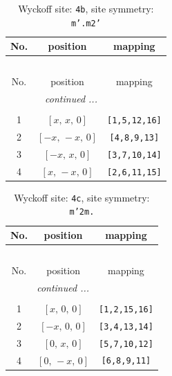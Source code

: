 \documentclass[fleqn,8pt]{jsarticle}
\begin{document}
\begin{longtable}{ccc}
\caption{Wyckoff site: {\tt 4b}, site symmetry: {\tt m'.m2'}}
 \\
 \hline \hline
No. & position & mapping \\ \hline \endfirsthead

\multicolumn{2}{l}{\tablename\ \thetable{}} \\
 \hline \hline
No. & position & mapping \\ \hline \endhead

 \hline \hline
\multicolumn{2}{r}{\footnotesize\it continued ...} \\ \endfoot

 \hline \hline
\multicolumn{2}{r}{} \\ \endlastfoot

1 & $\left[ x,\, x,\, 0 \right]$ & {\tt [1,5,12,16]} \\ \hline
2 & $\left[ - x,\, - x,\, 0 \right]$ & {\tt [4,8,9,13]} \\ \hline
3 & $\left[ - x,\, x,\, 0 \right]$ & {\tt [3,7,10,14]} \\ \hline
4 & $\left[ x,\, - x,\, 0 \right]$ & {\tt [2,6,11,15]} \\
\end{longtable}
\renewcommand{\arraystretch}{1.2}
\begin{longtable}{ccc}
\caption{Wyckoff site: {\tt 4c}, site symmetry: {\tt m'2m.}}
 \\
 \hline \hline
No. & position & mapping \\ \hline \endfirsthead

\multicolumn{2}{l}{\tablename\ \thetable{}} \\
 \hline \hline
No. & position & mapping \\ \hline \endhead

 \hline \hline
\multicolumn{2}{r}{\footnotesize\it continued ...} \\ \endfoot

 \hline \hline
\multicolumn{2}{r}{} \\ \endlastfoot

1 & $\left[ x,\, 0,\, 0 \right]$ & {\tt [1,2,15,16]} \\ \hline
2 & $\left[ - x,\, 0,\, 0 \right]$ & {\tt [3,4,13,14]} \\ \hline
3 & $\left[ 0,\, x,\, 0 \right]$ & {\tt [5,7,10,12]} \\ \hline
4 & $\left[ 0,\, - x,\, 0 \right]$ & {\tt [6,8,9,11]} \\
\end{longtable}
\end{document}
